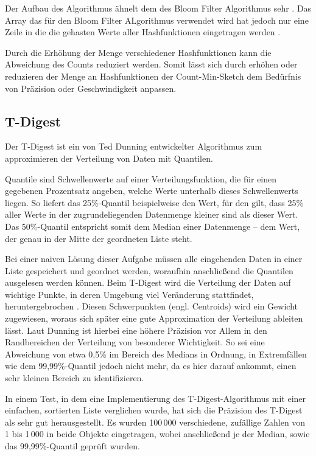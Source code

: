 Der Aufbau des Algorithmus ähnelt dem des Bloom Filter Algorithmus sehr \cite{cormode2017}. 
Das Array das für den Bloom Filter ALgorithmus verwendet wird 
hat jedoch nur eine Zeile in die die gehasten Werte aller Hashfunktionen eingetragen werden \cite{cormode2017}.

Durch die Erhöhung der Menge verschiedener Hashfunktionen kann die Abweichung des Counts reduziert werden. 
Somit lässt sich durch erhöhen oder reduzieren der Menge an Hashfunktionen 
der Count-Min-Sketch dem Bedürfnis von Präzision oder Geschwindigkeit anpassen.

\subsection{T-Digest}
Der T-Digest ist ein von Ted Dunning entwickelter Algorithmus zum approximieren der Verteilung von Daten mit Quantilen.

Quantile sind Schwellenwerte auf einer Verteilungsfunktion, die für einen gegebenen Prozentsatz angeben, welche Werte unterhalb dieses Schwellenwerts liegen.
So liefert das 25\%-Quantil beispielweise den Wert, für den gilt, dass 25\% aller Werte in der zugrundeliegenden Datenmenge kleiner sind als dieser Wert.
Das 50\%-Quantil entspricht somit dem Median einer Datenmenge -- dem Wert, der genau in der Mitte der geordneten Liste steht.

Bei einer naiven Lösung dieser Aufgabe müssen alle eingehenden Daten in einer Liste gespeichert und geordnet werden, woraufhin anschließend die Quantilen ausgelesen werden können.
Beim T-Digest wird die Verteilung der Daten auf wichtige Punkte, in deren Umgebung viel Veränderung stattfindet, heruntergebrochen \cite{davidsonpilon2015}.
Diesen Schwerpunkten (engl. Centroids) wird ein Gewicht zugewiesen, woraus sich später eine gute Approximation der Verteilung ableiten lässt.
Laut Dunning \cite{dunning2015} ist hierbei eine höhere Präzision vor Allem in den Randbereichen der Verteilung von besonderer Wichtigkeit.
So sei eine Abweichung von etwa 0,5\% im Bereich des Medians in Ordnung, in Extremfällen wie dem 99,99\%-Quantil jedoch nicht mehr, da es hier darauf ankommt, einen sehr kleinen Bereich zu identifizieren.

In einem Test, in dem eine Implementierung des T-Digest-Algorithmus mit einer einfachen, sortierten Liste verglichen wurde, hat sich die Präzision des T-Digest als sehr gut herausgestellt.
Es wurden 100\,000 verschiedene, zufällige Zahlen von 1 bis 1\,000 in beide Objekte eingetragen, wobei anschließend je der Median, sowie das 99,99\%-Quantil geprüft wurden.

